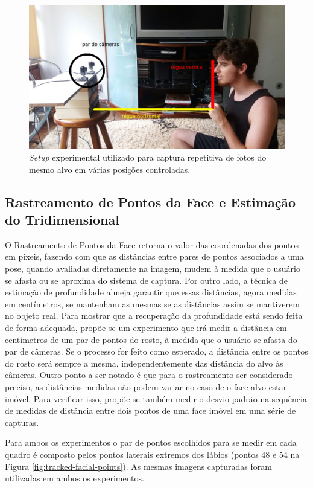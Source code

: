 \begin{figure}[!htp]
\centering
\includegraphics[width=0.8\linewidth]{figs/setupExperimento-comentado.png}
\caption{\textit{Setup} experimental utilizado para captura repetitiva de fotos do mesmo alvo em várias posições controladas.}
\label{fig:exp-montagem}
\end{figure}

\subsection{Rastreamento de Pontos da Face e Estimação do Tridimensional}

O Rastreamento de Pontos da Face retorna o valor das coordenadas dos pontos em
pixeis, fazendo com que as distâncias entre pares de pontos associados a uma
pose, quando avaliadas diretamente na imagem, mudem à medida que o usuário se
afasta ou se aproxima do sistema de captura. Por outro lado, a técnica de
estimação de profundidade almeja garantir que essas distâncias, agora medidas em
centímetros, se mantenham as mesmas se as distâncias assim se mantiverem no
objeto real. Para mostrar que a recuperação da profundidade está sendo feita de
forma adequada, propõe-se um experimento que irá medir a distância em
centímetros de um par de pontos do rosto, à medida que o usuário se afasta do
par de câmeras. Se o processo for feito como esperado, a distância entre os
pontos do rosto será sempre a mesma, independentemente das distância do alvo às
câmeras.  Outro ponto a ser notado é que para o rastreamento ser considerado
preciso, as distâncias medidas não podem variar no caso de o face alvo estar
imóvel. Para verificar isso, propõe-se também medir o desvio padrão na sequência
de medidas de distância entre dois pontos de uma face imóvel em uma série de
capturas.


Para ambos os experimentos o par de pontos escolhidos para se medir em cada
quadro é composto pelos pontos laterais extremos dos lábios (pontos 48 e 54 na
Figura \ref{fig:tracked-facial-points}). As mesmas imagens capturadas foram
utilizadas em ambos os experimentos.


